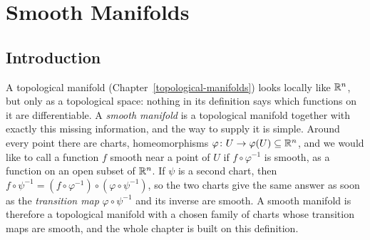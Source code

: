 \chapter{Smooth Manifolds}\label{smooth-manifolds}

\section{Introduction}\label{smooth-manifolds:section-introduction}

A topological manifold (Chapter~\ref{topological-manifolds}) looks locally like $\mathbb{R}^n$, but only as a topological space: nothing in its definition says which
functions on it are differentiable. A \emph{smooth manifold} is a topological manifold together with exactly this missing information, and the way to supply it
is simple. Around every point there are charts, homeomorphisms $\varphi \colon U \to \varphi(U) \subseteq \mathbb{R}^n$, and we would like to call a function $f$ smooth
near a point of $U$ if $f \circ \varphi^{-1}$ is smooth, as a function on an open subset of $\mathbb{R}^n$. If $\psi$ is a second chart, then
$f \circ \psi^{-1} = (f \circ \varphi^{-1}) \circ (\varphi \circ \psi^{-1})$, so the two charts give the same answer as soon as the \emph{transition map}
$\varphi \circ \psi^{-1}$ and its inverse are smooth. A smooth manifold is therefore a topological manifold with a chosen family of charts whose transition maps
are smooth, and the whole chapter is built on this definition.

